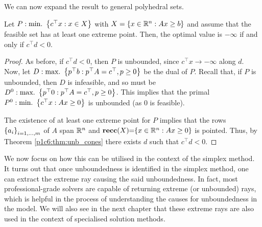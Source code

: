 We can now expand the result to general polyhedral sets.

\begin{theorem}\label{p1c6:thm:unb_polyhedra} 
	Let $P : \mathop{\text{min.~}}\left\{ c^\top x : x \in X \right \}$ with $X = \left\{ x \in \mathbb{R}^n : Ax \geq b \right \}$ and assume that the feasible set has at least one extreme point. Then, the optimal value is $-\infty$ if and only if $c^\top d < 0$.  	
\end{theorem}

\begin{proof}
	As before, if $c^\top d < 0$, then $P$ is unbounded, since $c^\top x \rightarrow -\infty$ along $d$. Now, let 
	$D : \mathop{\text{max.~}} \left\{ p^\top b : p^\top A = c^\top, p \ge 0 \right \}$ be the dual of $P$. Recall that, if $P$ is unbounded, then $D$ is infeasible, and so must be $D^0 : \mathop{\text{max.~}} \left\{ p^\top 0 : p^\top A = c^\top, p \ge 0 \right \}$. This implies that the primal $P^0 : \mathop{\text{min.~}} \left\{ c^\top x : Ax \geq 0 \right \}$ is unbounded (as 0 is feasible).
			
	The existence of at least one extreme point for $P$ implies that the rows $\left\{ a_i \right \}_{i=1,\dots,m}$ of $A$ span $\mathbb{R}^n$ and  ${\bf recc}(X) \hspace{-3pt} =  \hspace{-3pt}\left\{ x \in \mathbb{R}^n : Ax \geq 0 \right \}$ is pointed. Thus, by Theorem \ref{p1c6:thm:unb_cones} there exists $d$ such that $c^\top d < 0$. \qedhere
\end{proof}

We now focus on how this can be utilised in the context of the simplex method. It turns out that once unboundedness is identified in the simplex method, one can extract the extreme ray causing the said unboundedness. In fact, most professional-grade solvers are capable of returning extreme (or unbounded) rays, which is helpful in the process of understanding the causes for unboundedness in the model. We will also see in the next chapter that these extreme rays are also used in the context of specialised solution methods.

